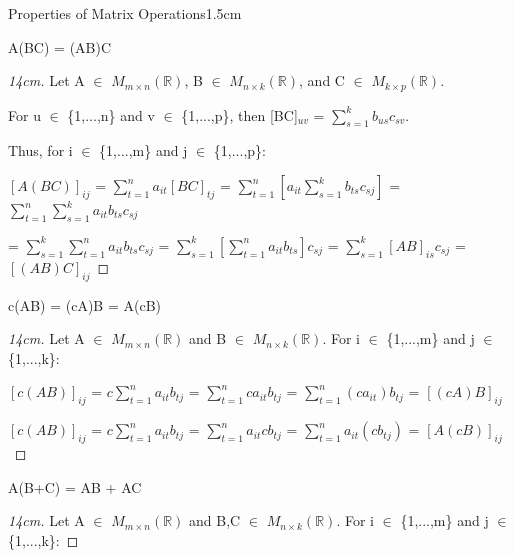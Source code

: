 \begin{ltheorem}{Properties of Matrix Operations}{1.5cm}
        \item A(BC) = (AB)C
        
            \begin{proof}[14cm]
                Let A $\in$ $M_{m \times n}(\mathbb{R})$,
                B $\in$ $M_{n \times k}(\mathbb{R})$,
                and C $\in$ $M_{k \times p}(\mathbb{R})$.

                For u $\in$ \{1,...,n\} and v $\in$ \{1,...,p\}, then
                [BC]$_{uv}$ = $\sum_{s=1}^k b_{us}c_{sv}$.

                Thus, for i $\in$ \{1,...,m\} and j $\in$ \{1,...,p\}:

                \hspace{0.2cm}
                $[A(BC)]_{ij}$ = $\sum_{t=1}^n a_{it}[BC]_{tj}$
                = $\sum_{t=1}^n [a_{it} \sum_{s=1}^k b_{ts}c_{sj}]$
                = $\sum_{t=1}^n \sum_{s=1}^k a_{it}b_{ts}c_{sj}$

                \hspace{0.2cm}
                = $\sum_{s=1}^k \sum_{t=1}^n a_{it}b_{ts}c_{sj}$
                = $\sum_{s=1}^k [\sum_{t=1}^n a_{it}b_{ts}]c_{sj}$
                = $\sum_{s=1}^k [AB]_{is} c_{sj}$
                = $[(AB)C]_{ij}$
            \end{proof}
        
        \item c(AB) = (cA)B = A(cB)
        
            \begin{proof}[14cm]
                Let A $\in$ $M_{m \times n}(\mathbb{R})$ and
                B $\in$ $M_{n \times k}(\mathbb{R})$.
                For i $\in$ \{1,...,m\} and j $\in$ \{1,...,k\}:

                \hspace{0.5cm}
                $[c(AB)]_{ij}$ = $c\sum_{t=1}^n a_{it}b_{tj}$
                = $\sum_{t=1}^n ca_{it}b_{tj}$
                = $\sum_{t=1}^n (ca_{it})b_{tj}$
                = $[(cA)B]_{ij}$

                \hspace{0.5cm}
                $[c(AB)]_{ij}$ = $c\sum_{t=1}^n a_{it}b_{tj}$
                = $\sum_{t=1}^n a_{it}cb_{tj}$
                = $\sum_{t=1}^n a_{it}(cb_{tj})$
                = $[A(cB)]_{ij}$
            \end{proof}

        \item A(B+C) = AB + AC
        
            \begin{proof}[14cm]
                Let A $\in$ $M_{m \times n}(\mathbb{R})$ and
                B,C $\in$ $M_{n \times k}(\mathbb{R})$.
                For i $\in$ \{1,...,m\} and j $\in$ \{1,...,k\}:


\end{proof}
\end{ltheorem}
